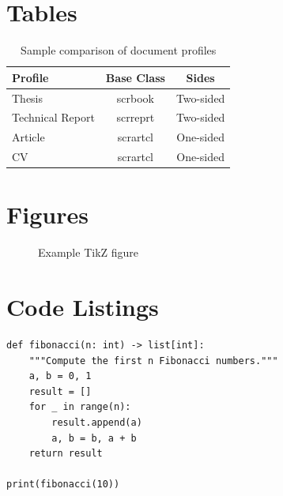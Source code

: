 \documentclass[
  doctype=thesis,
  language=english,
  institution=none,
]{omnilatex}
\begin{document}
\section{Tables}

\begin{table}[htbp]
  \centering
  \caption{Sample comparison of document profiles}
  \label{tab:profiles}
  \begin{tabular}{lcc}
    \toprule
    \textbf{Profile} & \textbf{Base Class} & \textbf{Sides} \\
    \midrule
    Thesis            & scrbook  & Two-sided \\
    Technical Report  & scrreprt & Two-sided \\
    Article           & scrartcl & One-sided  \\
    CV                & scrartcl & One-sided  \\
    \bottomrule
  \end{tabular}
\end{table}

\section{Figures}

\begin{figure}[htbp]
  \centering
  \caption{Example TikZ figure}
  \label{fig:example}
\end{figure}


\section{Code Listings}

\begin{listing}[htbp]
  \begin{verbatim}
def fibonacci(n: int) -> list[int]:
    """Compute the first n Fibonacci numbers."""
    a, b = 0, 1
    result = []
    for _ in range(n):
        result.append(a)
        a, b = b, a + b
    return result

print(fibonacci(10))
  \end{verbatim}
  \caption{Fibonacci sequence in Python}
  \label{lst:fibonacci}
\end{listing}
\end{document}
